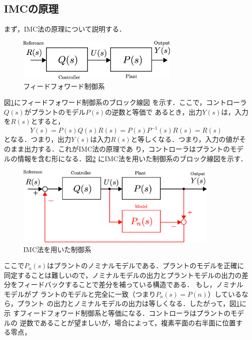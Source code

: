 \documentclass[a4paper,12pt]{jarticle}
\begin{document}
\subsection{IMCの原理}
まず，IMC法の原理について説明する．
%
\begin{figure}[bp]
 \begin{center}
  \includegraphics[width = 80mm]{fig/FF.eps}
 \end{center}
 \caption{フィードフォワード制御系}
 \label{fig:ff}
\end{figure}
%
図\ref{fig:ff}にフィードフォワード制御系のブロック線図
を示す．ここで，コントローラ$Q(s)$がプラントのモデル$P(s)$の逆数と等価で
あるとき，出力$Y(s)$は，入力を$R(s)$とすると，
\begin{equation}
Y(s) = P(s)Q(s)R(s) = P(s)P^{-1}(s)R(s) =R(s)
\end{equation}
となる．つまり，出力$Y(s)$は入力$R(s)$と等しくなる．つまり，入力の値がそ
のまま出力する．これがIMC法の原理であ
り，コントローラはプラントのモデルの情報を含む形になる．図\ref{fig:IMC}
にIMC法を用いた制御系のブロック線図を示す．
%
\begin{figure}[tbp]
 \begin{center}
  \includegraphics[width = 100mm]{fig/IMC.eps}
 \end{center}
 \caption{IMC法を用いた制御系}
 \label{fig:IMC}
\end{figure}
%
ここで$P_n(s)$はプラントのノミナルモデルである．プラントのモデルを正確に
同定することは難しいので，ノミナルモデルの出力とプラントモデルの出力の差
分をフィードバックすることで差分を補っている構造である．
もし，ノミナルモデルがプ
ラントのモデルと完全に一致（つまり$P_n(s)=P(n)$）しているなら，プラント
の出力とノミナルモデルの出力は等しくなる．したがって，図\ref{fig:ff}に示
すフィードフォワード制御系と等価になる．コントローラはプラントのモデルの
逆数であることが望ましいが，場合によって，複素平面の右半面に位置する零点，
\end{document}
